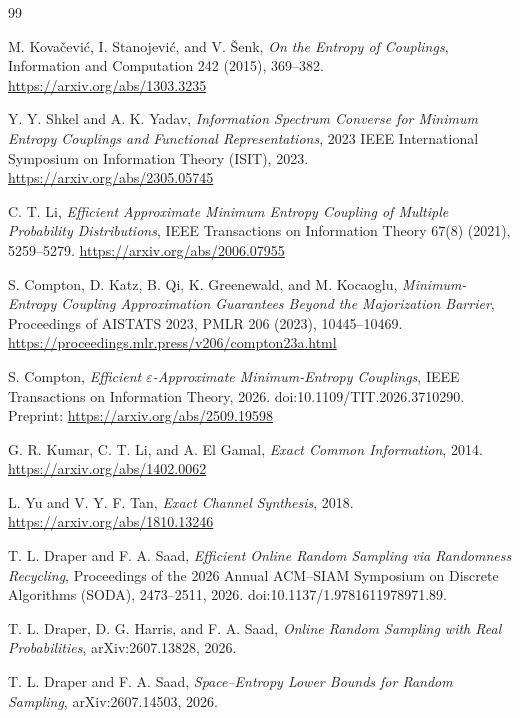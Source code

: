 \documentclass[11pt,a4paper]{article}
\newcommand{\1}{\mathbf 1}
\begin{document}
\begin{thebibliography}{99}

M. Kovačević, I. Stanojević, and V. Šenk,
\emph{On the Entropy of Couplings},
Information and Computation 242 (2015), 369--382.
\url{https://arxiv.org/abs/1303.3235}

Y. Y. Shkel and A. K. Yadav,
\emph{Information Spectrum Converse for Minimum Entropy Couplings and
Functional Representations},
2023 IEEE International Symposium on Information Theory (ISIT), 2023.
\url{https://arxiv.org/abs/2305.05745}

C. T. Li,
\emph{Efficient Approximate Minimum Entropy Coupling of Multiple
Probability Distributions},
IEEE Transactions on Information Theory 67(8) (2021), 5259--5279.
\url{https://arxiv.org/abs/2006.07955}

S. Compton, D. Katz, B. Qi, K. Greenewald, and M. Kocaoglu,
\emph{Minimum-Entropy Coupling Approximation Guarantees Beyond the
Majorization Barrier},
Proceedings of AISTATS 2023,
PMLR 206 (2023), 10445--10469.
\url{https://proceedings.mlr.press/v206/compton23a.html}

S. Compton,
\emph{Efficient $\varepsilon$-Approximate Minimum-Entropy Couplings},
IEEE Transactions on Information Theory, 2026.
doi:10.1109/TIT.2026.3710290.
Preprint:
\url{https://arxiv.org/abs/2509.19598}

G. R. Kumar, C. T. Li, and A. El Gamal,
\emph{Exact Common Information},
2014.
\url{https://arxiv.org/abs/1402.0062}

L. Yu and V. Y. F. Tan,
\emph{Exact Channel Synthesis},
2018.
\url{https://arxiv.org/abs/1810.13246}

T. L. Draper and F. A. Saad,
\emph{Efficient Online Random Sampling via Randomness Recycling},
Proceedings of the 2026 Annual ACM--SIAM Symposium on Discrete
Algorithms (SODA), 2473--2511, 2026.
doi:10.1137/1.9781611978971.89.

T. L. Draper, D. G. Harris, and F. A. Saad,
\emph{Online Random Sampling with Real Probabilities},
arXiv:2607.13828, 2026.

T. L. Draper and F. A. Saad,
\emph{Space--Entropy Lower Bounds for Random Sampling},
arXiv:2607.14503, 2026.


\end{thebibliography}
\end{document}
